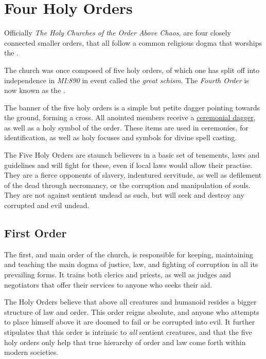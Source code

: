 \section{Four Holy Orders}
\label{sec:Four Holy Orders}

Officially \emph{The Holy Churches of the Order Above Chaos}, are four closely
connected smaller orders, that all follow a common religious dogma that
worships the .

The church was once composed of five holy orders, of which one has split off
into independence in \emph{MI:890} in event called the \emph{great
  schism}. The \emph{Fourth Order} is now known as the .

The banner of the five holy orders is a simple but petite dagger pointing
towards the ground, forming a cross. All anointed members receive a
\hyperref[sec:Dagger of the Order]{ceremonial dagger}, as well as a holy
symbol of the order. These items are used in ceremonies, for identification,
as well as holy focuses and symbols for divine spell casting.

The Five Holy Orders are staunch believers in a basic set of tenements, laws
and guidelines and will fight for these, even if local laws would allow their
practise. They are a fierce opponents of slavery, indentured servitude, as
well as defilement of the dead through necromancy, or the corruption and
manipulation of souls. They are not against sentient undead as such, but will
seek and destroy any corrupted and evil undead.

\subsection{First Order}
\label{sec:First Order}

The first, and main order of the church, is responsible for keeping, maintaining
and teaching the main dogma of justice, law, and fighting of corruption in all
its prevailing forms. It trains both clerics and priests, as well as judges and
negotiators that offer their services to anyone who seeks their aid.

The Holy Orders believe that above all creatures and humanoid resides a bigger
structure of law and order. This order reigns absolute, and anyone who attempts
to place himself above it are doomed to fail or be corrupted into evil. It
further stipulates that this order is intrinsic to \emph{all} sentient
creatures, and that the five holy orders only help that true hierarchy of order
and law come forth within modern societies.

